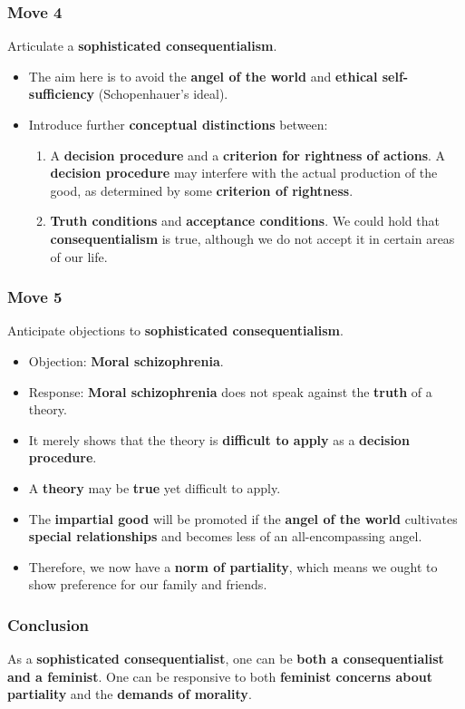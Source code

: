 \documentclass[11pt]{article}
\begin{document}
\subsubsection{Move 4}
\label{sec:org67aacf8}
Articulate a \textbf{sophisticated consequentialism}.
\begin{itemize}
\item The aim here is to avoid the \textbf{angel of the world} and \textbf{ethical self-sufficiency} (Schopenhauer's ideal).
\item Introduce further \textbf{conceptual distinctions} between:
\begin{enumerate}
\item A \textbf{decision procedure} and a \textbf{criterion for rightness of actions}.
A \textbf{decision procedure} may interfere with the actual production of the good, as determined by some \textbf{criterion of rightness}.
\item \textbf{Truth conditions} and \textbf{acceptance conditions}.
We could hold that \textbf{consequentialism} is true, although we do not accept it in certain areas of our life.
\end{enumerate}
\end{itemize}
\subsubsection{Move 5}
\label{sec:orgbadb504}
Anticipate objections to \textbf{sophisticated consequentialism}.
\begin{itemize}
\item Objection: \textbf{Moral schizophrenia}.
\item Response: \textbf{Moral schizophrenia} does not speak against the \textbf{truth} of a theory.
\item It merely shows that the theory is \textbf{difficult to apply} as a \textbf{decision procedure}.
\item A \textbf{theory} may be \textbf{true} yet difficult to apply.
\item The \textbf{impartial good} will be promoted if the \textbf{angel of the world} cultivates \textbf{special relationships} and becomes less of an all-encompassing angel.
\item Therefore, we now have a \textbf{norm of partiality}, which means we ought to show preference for our family and friends.
\end{itemize}
\subsubsection{Conclusion}
\label{sec:orge8e96fc}
As a \textbf{sophisticated consequentialist}, one can be \textbf{both a consequentialist and a feminist}. One can be responsive to both \textbf{feminist concerns about partiality} and the \textbf{demands of morality}.
\end{document}
